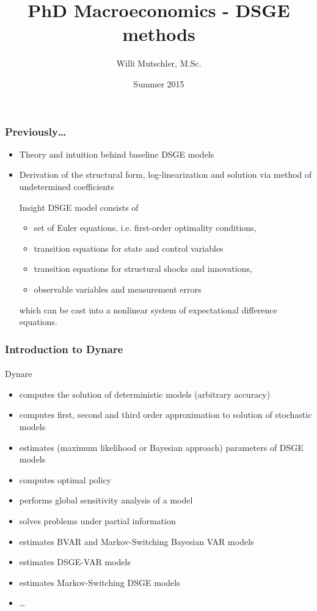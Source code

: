 \documentclass[handout]{beamer}  %
\begin{document}
\author[Willi Mutschler]{Willi Mutschler, M.Sc.}
\date{Summer 2015}
\title[DSGE methods]{PhD Macroeconomics - DSGE methods}

\begin{frame}
\titlepage
\end{frame}

\begin{frame}\frametitle{Previously\dots}
\begin{itemize}[<+->]
  \item Theory and intuition behind baseline DSGE models
  \item Derivation of the structural form, log-linearization and solution via method of undetermined coefficients
\begin{block}{Insight}
DSGE model consists of
\begin{itemize}
     \item set of Euler equations, i.e. first-order optimality conditions,
     \item transition equations for state and control variables
     \item transition equations for structural shocks and innovations,
     \item observable variables and measurement errors
\end{itemize}
which can be cast into a nonlinear system of expectational difference equations.
\end{block}
\end{itemize}
\end{frame}

\begin{frame}
	\frametitle{Introduction to Dynare}\framesubtitle{}
	Dynare
	\begin{itemize}
		\item computes the solution of deterministic models (arbitrary accuracy)
		\item computes first, second and third order approximation to solution of stochastic models
		\item estimates (maximum likelihood or Bayesian approach) parameters of DSGE models
		\item computes optimal policy
		\item performs global sensitivity analysis of a model
		\item solves problems under partial information
		\item estimates BVAR and Markov-Switching Bayesian VAR models
		\item estimates DSGE-VAR models
		\item estimates Markov-Switching DSGE models
		\item \dots
	\end{itemize}
\end{frame}
\end{document}
